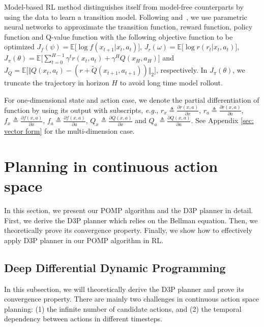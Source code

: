 \documentclass{article}
\newcommand{\yue}[1]{ {#1}}
\begin{document}
 Model-based RL method distinguishes itself from model-free counterparts by using the data  to learn a transition model.  Following  and~, we use parametric neural networks to approximate the transition function, reward function, policy function and Q-value function with the following objective function to be optimized
$J_f(\psi) = \mathbb{E}\big[\log f(x_{t+1}|x_t,a_t) \big]$,
 $J_r(\omega) = \mathbb{E}\big[\log r(r_t|x_t,a_t) \big]$,
 $J_\pi(\theta) = \mathbb{E}\big[ \sum_{t=0}^{H-1} \gamma^t r(x_t, a_t) + \gamma^H Q(x_H, a_H) \big]$ and
 $J_Q = \mathbb{E}\big [ \Vert Q(x_t, a_t)  - (r+\tilde{Q}(x_{t+1},a_{t+1} ))\Vert_2\big] $, respectively. In $J_\pi(\theta)$, we truncate the trajectory in horizon $H$ to avoid long time model rollout. 

\yue{  For one-dimensional state and action case, we denote the partial differentiation of function by using its output with subscripts, \emph{e.g.}, $r_x\triangleq\frac{ \partial r(x,a)  }{\partial x}$, $r_a\triangleq\frac{ \partial r(x,a)  }{\partial a}$, $f_x\triangleq\frac{ \partial f(x,a)  }{\partial x}$, $f_a\triangleq\frac{ \partial f(x,a)  }{\partial a}$, $Q_x\triangleq\frac{ \partial Q(x,a)  }{\partial x}$ and $Q_a\triangleq\frac{ \partial Q(x,a)  }{\partial a}$. See Appendix \ref{sec: vector form} for the multi-dimension case.}

\section{ Planning in continuous action space }

In this section, we present our POMP algorithm and the D3P planner in detail.  First, we derive the  D3P planner which relies on the Bellman equation. Then, we theoretically prove its convergence property. 
Finally, we show how to effectively apply D3P planner in our POMP algorithm in RL.

    
    

\subsection{Deep Differential Dynamic Programming}
In this subsection, we will theoretically derive the D3P planner and prove its convergence property.
There are mainly two challenges in  continuous action space planning: (1) the infinite number of  candidate actions, and (2) the temporal dependency between actions in different timesteps.  
\end{document}
